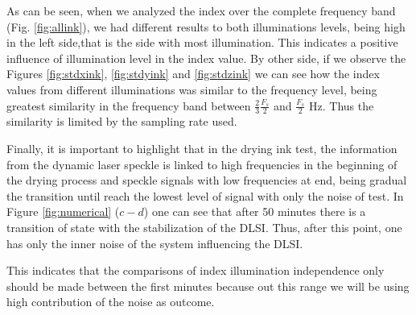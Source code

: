 \documentclass[review]{elsarticle}
\begin{document}
As can be seen, when we analyzed the index over the complete frequency band (Fig. \ref{fig:allink}),
we had different results to both illuminations levels, being high in the left side,that is the side with most illumination. This 
indicates a positive influence of illumination level in the index value.
By other side, if we observe the Figures \ref{fig:stdxink}, \ref{fig:stdyink} and \ref{fig:stdzink}
we can see how the index values from different
illuminations  was similar to the frequency level,
being greatest similarity in the frequency band between $\frac{2}{3}\frac{F_s}{2}$ and $\frac{F_s}{2}$ Hz.
Thus the similarity is limited by the sampling rate used.

Finally, it is important to highlight that in the drying ink test, the information from the dynamic laser speckle is linked to high frequencies in the beginning of the drying process and  speckle signals with low frequencies at end, being gradual the transition
until reach the lowest level of signal with only the noise of test.
In Figure \ref{fig:numerical} ($c-d$) one can see that after 50 minutes there is a transition of state with the stabilization of the DLSI. Thus, after this point, one has only the inner noise of the system influencing the DLSI.

This indicates that the comparisons of index illumination independence
only should be made between the first minutes because out this range we will be using high contribution of 
the noise as outcome.
\end{document}
